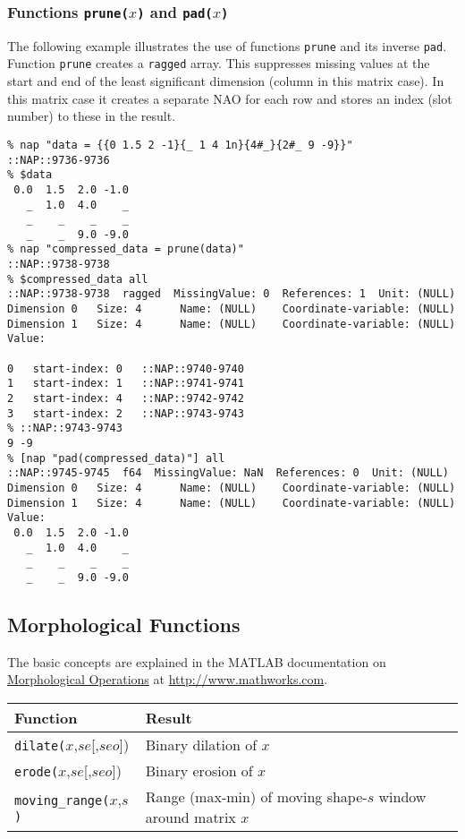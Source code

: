 \subsubsection{Functions \texttt{prune(}$x$\texttt{)} and \texttt{pad(}$x$\texttt{)}}
    \label{functions-prune-pad}

The following example illustrates the use of functions 
  \texttt{prune} and its inverse 
  \texttt{pad}. Function 
  \texttt{prune} creates a 
  \texttt{ragged} array. This suppresses missing values at the
  start and end of the least significant dimension (column in this
  matrix case). In this matrix case it creates a separate NAO for each
  row and stores an index (slot number) to these in the result.
  \begin{verbatim}
% nap "data = {{0 1.5 2 -1}{_ 1 4 1n}{4#_}{2#_ 9 -9}}"
::NAP::9736-9736
% $data
 0.0  1.5  2.0 -1.0
   _  1.0  4.0    _
   _    _    _    _
   _    _  9.0 -9.0
% nap "compressed_data = prune(data)"
::NAP::9738-9738
% $compressed_data all
::NAP::9738-9738  ragged  MissingValue: 0  References: 1  Unit: (NULL)
Dimension 0   Size: 4      Name: (NULL)    Coordinate-variable: (NULL)
Dimension 1   Size: 4      Name: (NULL)    Coordinate-variable: (NULL)
Value:

0   start-index: 0   ::NAP::9740-9740
1   start-index: 1   ::NAP::9741-9741
2   start-index: 4   ::NAP::9742-9742
3   start-index: 2   ::NAP::9743-9743
% ::NAP::9743-9743
9 -9
% [nap "pad(compressed_data)"] all
::NAP::9745-9745  f64  MissingValue: NaN  References: 0  Unit: (NULL)
Dimension 0   Size: 4      Name: (NULL)    Coordinate-variable: (NULL)
Dimension 1   Size: 4      Name: (NULL)    Coordinate-variable: (NULL)
Value:
 0.0  1.5  2.0 -1.0
   _  1.0  4.0    _
   _    _    _    _
   _    _  9.0 -9.0
\end{verbatim}

\subsection{Morphological Functions}
    \label{function-Morphological}

  \par The basic concepts are explained in the MATLAB documentation on 
  \href{http://www.mathworks.com/access/helpdesk/help/toolbox/images/morph.html}
  {Morphological Operations}
  at
  \href{http://www.mathworks.com} {http://www.mathworks.com}.

  \begin{tabular}{|l|l|}
    \hline 
      \textbf{Function} & \textbf{Result}
    \\
      \hline 
      \hline 
        \texttt{dilate(}$x$,$se$[,$seo$]) & Binary dilation of $x$
      \\
      \hline 
        \texttt{erode(}$x$,$se$[,$seo$]) & Binary erosion of $x$
      \\
      \hline 
        \texttt{moving\_range(}$x$,$s$\texttt{)} & Range (max-min) of moving shape-$s$ window around matrix $x$
      \\
  \hline
\end{tabular}

